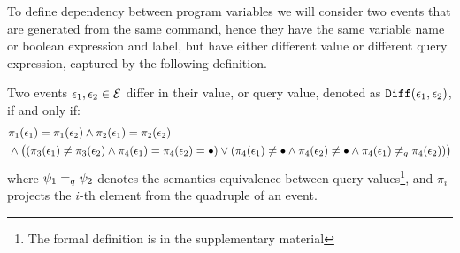 To define dependency between program variables we will consider two events that are generated from the same command, hence they have the same variable name or boolean expression and label, but have either different value or different query expression, captured by the following definition. 

\begin{defn}
\label{def:diff}
Two events $\mathtt{\epsilon}_1, \mathtt{\epsilon}_2 \in \mathcal{E}$ differ in their value, or query value,
denoted as $\mathtt{Diff}(\mathtt{\epsilon}_1, \mathtt{\epsilon}_2)$, if and only if:
{\small
\begin{subequations}
\begin{align}
& \pi_1(\mathtt{\epsilon}_1) = \pi_1(\mathtt{\epsilon}_2) 
  \land  
  \pi_2(\mathtt{\epsilon}_1) = \pi_2(\mathtt{\epsilon}_2) \\
& \land  
  \big(
   (\pi_3(\mathtt{\epsilon}_1) \neq \pi_3(\mathtt{\epsilon}_2)
  \land 
  \pi_{4}(\mathtt{\epsilon}_1) = \pi_{4}(\mathtt{\epsilon}_2) = \bullet )
  \lor 
  (\pi_4(\mathtt{\epsilon}_1) \neq \bullet
  \land 
  \pi_4(\mathtt{\epsilon}_2) \neq \bullet
  \land 
  \pi_{4}(\mathtt{\epsilon}_1) \neq_q \pi_{4}(\mathtt{\epsilon}_2)) 
  \big)
\end{align}
\label{eq:diff}
\end{subequations}
}
where $\psi_1 =_{q} \psi_2$ denotes the semantics equivalence between query values\footnote{The formal definition is in the supplementary material},
and $\pi_i$ projects the $i$-th element from the quadruple of an event.
\end{defn}

